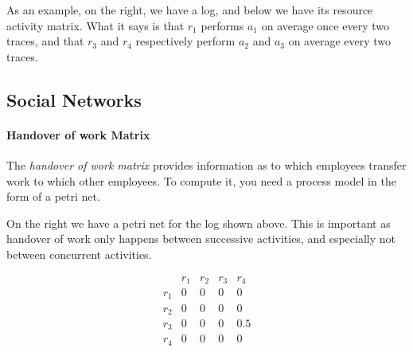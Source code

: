 \documentclass[english]{panikzettel}
\begin{document}
As an example, on the right, we have a log, and below we have its resource activity matrix. What it says is that $r_1$ performs $a_1$ on average once every two traces, and that $r_3$ and $r_4$ respectively perform $a_2$ and $a_3$ on average every two traces.

\subsection{Social Networks}

\begin{halfboxl}
\paragraph{Handover of work Matrix} The \textit{handover of work matrix} provides information as to which employees transfer work to which other employees. To compute it, you need a process model in the form of a petri net.

On the right we have a petri net for the log shown above. This is important as handover of work only happens between successive activities, and especially not between concurrent activities.
\end{halfboxl}%
\begin{halfboxr}
\vspace{-\baselineskip}
    \begin{center}
    \end{center}
    \[\begin{array}{c|c|c|c|c}
        & r_1   & r_2   & r_3   & r_4   \\ \hline
    r_1 & 0     & 0     & 0     & 0     \\ \hline
    r_2 & 0     & 0     & 0     & 0     \\ \hline
    r_3 & 0     & 0     & 0     & 0.5   \\ \hline
    r_4 & 0     & 0     & 0     & 0     \\
\end{array}\]
\end{halfboxr}
\end{document}
